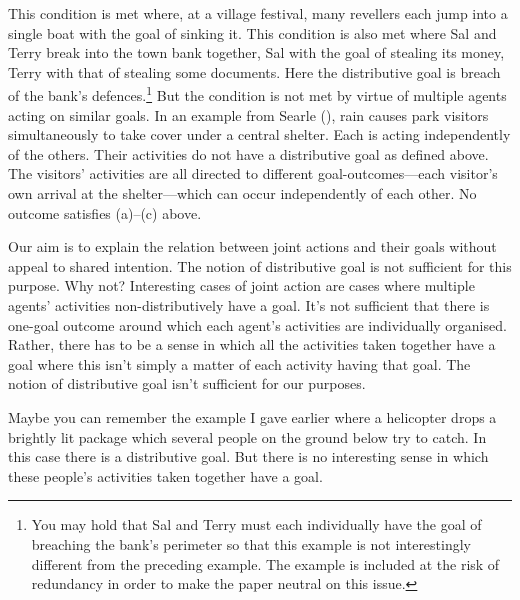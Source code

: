 \documentclass[12pt,a4paper]{extarticle}
\begin{document}
This condition is met where, at a village festival, many revellers each jump into a single boat with the goal of sinking it.  This condition is also met where Sal and Terry break into the town bank together, Sal with the goal of stealing its money, Terry with that of stealing some documents.  Here the distributive goal is breach of the bank's defences.\footnote
{
You may hold that Sal and Terry must each individually have the goal of breaching the bank's perimeter so that this example is not interestingly different from the preceding example.  
The example is included at the risk of redundancy in order to make the paper neutral on this issue.
}  
But the condition is not met by virtue of multiple agents acting on similar goals.  In an example from Searle (\citeyear[p.\ 92]{Searle:1990em}), rain causes park visitors simultaneously to take cover under a central shelter.  Each is acting independently of the others.  Their activities do not have a distributive goal as defined above.  The visitors' activities are all directed to different goal-outcomes---each visitor's own arrival at the shelter---which can occur independently of each other.  No outcome satisfies (a)--(c) above.


Our aim is to explain the relation between joint actions and their goals without appeal to shared intention.  The notion of distributive goal is not sufficient for this purpose.  
Why not?
Interesting cases of joint action are cases where multiple agents' activities non-distributively have a goal.  It's not sufficient that there is one-goal outcome around which each agent's activities are individually organised.  Rather, there has to be a sense in which all the activities taken together have a goal where this isn't simply a matter of each activity having that goal.
The notion of distributive goal isn't sufficient for our purposes.

Maybe you can remember the example I gave earlier where a helicopter drops a brightly lit package which several people on the ground below try to catch.  In this case there is a distributive goal.  But there is no interesting sense in which these people's activities taken together have a goal.



\end{document}
